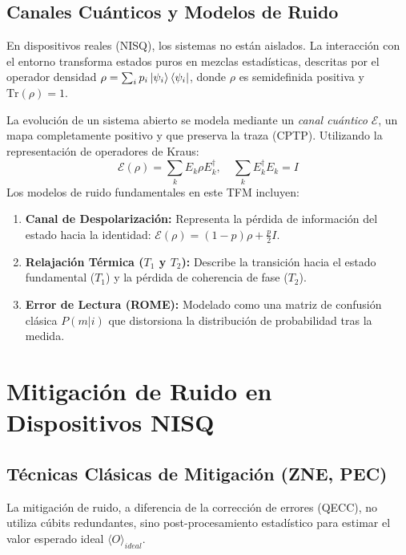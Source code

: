 \subsection{Canales Cuánticos y Modelos de Ruido}

En dispositivos reales (NISQ), los sistemas no están aislados. La interacción con el entorno transforma estados puros en mezclas estadísticas, descritas por el operador densidad $\rho = \sum_i p_i \ket{\psi_i}\bra{\psi_i}$, donde $\rho$ es semidefinida positiva y $\text{Tr}(\rho) = 1$.

La evolución de un sistema abierto se modela mediante un \textit{canal cuántico} $\mathcal{E}$, un mapa completamente positivo y que preserva la traza (CPTP). Utilizando la representación de operadores de Kraus:
\begin{equation}
\mathcal{E}(\rho) = \sum_{k} E_k \rho E_k^{\dagger}, \quad \sum_{k} E_k^{\dagger} E_k = I
\end{equation}
Los modelos de ruido fundamentales en este TFM incluyen:
\begin{enumerate}
    \item \textbf{Canal de Despolarización:} Representa la pérdida de información del estado hacia la identidad: $\mathcal{E}(\rho) = (1-p)\rho + \frac{p}{2}I$.
    \item \textbf{Relajación Térmica ($T_1$ y $T_2$):} Describe la transición hacia el estado fundamental ($T_1$) y la pérdida de coherencia de fase ($T_2$).
    \item \textbf{Error de Lectura (ROME):} Modelado como una matriz de confusión clásica $P(m|i)$ que distorsiona la distribución de probabilidad tras la medida.
\end{enumerate}

\section{Mitigación de Ruido en Dispositivos NISQ}

\subsection{Técnicas Clásicas de Mitigación (ZNE, PEC)}

La mitigación de ruido, a diferencia de la corrección de errores (QECC), no utiliza cúbits redundantes, sino post-procesamiento estadístico para estimar el valor esperado ideal $\langle O \rangle_{ideal}$.

